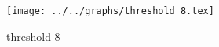 \begin{figure}[h] \centering\texttt{[image: ../../graphs/threshold\_8.tex]}\caption{threshold 8}\label{gr:threshold_8} \end{figure}
